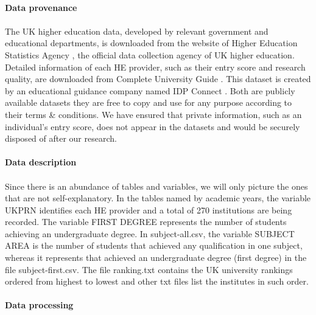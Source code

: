 \documentclass[11pt,a4paper]{article}
\begin{document}
\paragraph{Data provenance} 
\paragraph{}

The UK higher education data, developed by relevant government and educational departments, is downloaded from the website of Higher Education Statistics Agency \cite{HESA}, the official data collection agency of UK higher education. Detailed information of each HE provider, such as their entry score and research quality, are downloaded from Complete University Guide \cite{CUG}. This dataset is created by an educational guidance company named IDP Connect \cite{IDP}. Both are publicly available datasets they are free to copy and use for any purpose according to their terms \& conditions. We have ensured that private information, such as an individual's entry score, does not appear in the datasets and would be securely disposed of after our research. 

\paragraph{Data description} 
\paragraph{}

Since there is an abundance of tables and variables, we will only picture the ones that are not self-explanatory. In the tables named by academic years, the variable UKPRN identifies each HE provider and a total of 270 institutions are being recorded. The variable FIRST DEGREE represents the number of students achieving an undergraduate degree. In subject-all.csv, the variable SUBJECT AREA is the number of students that achieved any qualification in one subject, whereas it represents that achieved an undergraduate degree (first degree) in the file subject-first.csv. The file ranking.txt contains the UK university rankings ordered from highest to lowest and other txt files list the institutes in such order. 

\paragraph{Data processing} 
\paragraph{}
\end{document}
